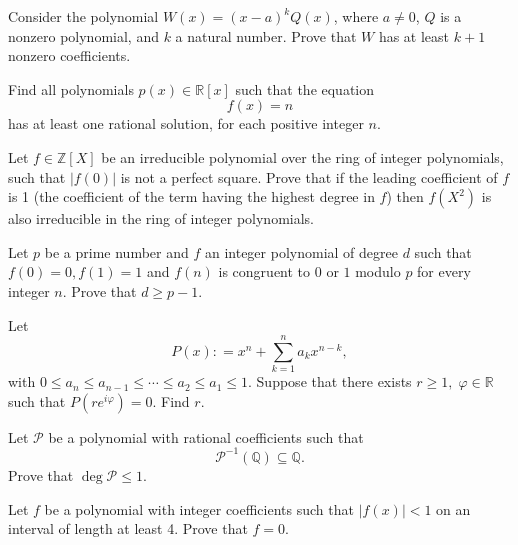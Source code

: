 \documentclass[12pt,a4paper]{memoir}
\theoremstyle{definition}
\begin{document}
\begin{question}
	Consider the polynomial $W(x) = (x - a)^kQ(x)$, where $a \neq 0$, $Q$ is a nonzero polynomial, and $k$ a natural number. Prove that $W$ has at least $k + 1$ nonzero coefficients.
\end{question}



\begin{question}
	Find all polynomials $p(x) \in \mathbb{R}[x]$ such that the equation \[f(x) = n\] has at least one rational solution, for each positive integer $n$.
\end{question}



\begin{question}
	Let $f\in\mathbb{Z}[X]$ be an irreducible polynomial over the ring  of integer polynomials, such that $|f(0)|$ is not a perfect square. Prove that if the leading coefficient of $f$ is 1 (the coefficient of the term having the highest degree in $f$) then $f(X^2)$ is also irreducible in the ring of integer polynomials.
\end{question}



\begin{question}
	Let $ p$ be a prime number and $ f$ an integer polynomial of degree $ d$ such that $ f(0) = 0,f(1) = 1$ and $ f(n)$ is congruent to $ 0$ or $ 1$ modulo $ p$ for every integer $ n$. Prove that $ d\geq p - 1$.
\end{question}



\begin{question}
	Let \[P(x): =x^{n}+\sum\limits_{k=1}^{n}a_kx^{n-k},\] with $0\leq a_n\leq a_{n-1}\leq \cdots \leq a_2\leq a_1\le 1$. Suppose that there exists $r\ge 1 ,\; \varphi \in {\mathbb R}$  such that  $P(re^{i\varphi})=0$. Find $r$.
\end{question}



\begin{question}
	Let $\mathcal P$ be a polynomial with rational coefficients such that
	\[\mathcal P^{-1}(\mathbb{Q}) \subseteq \mathbb{Q}.\]
	Prove that $\deg\mathcal P \leq 1$.
\end{question}


\begin{question}
	Let $f$ be a polynomial with integer coefficients such that $|f(x)|<1$ on an interval of length at least 4. Prove that  $f=0$.
\end{question}
\end{document}
